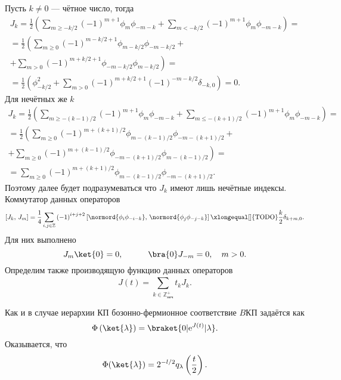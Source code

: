 \documentclass[a4paper,14pt]{extarticle}
\numberwithin{equation}{section}
\begin{document}
Пусть $k\neq 0$ --- чётное число, тогда
\begin{multline}
	J_k=\frac{1}{2} \left(\sum_{m\ge -k /2}^{} (-1)^{m+1}
	\phi_m \phi_{-m-k}+
\sum_{m<-k /2}^{} (-1)^{m+1}\phi_m \phi_{-m-k}\right)=\\=
\frac{1}{2}\left( \sum_{m\ge 0}^{} \left( -1 \right) ^{m-k /2+1}\phi_{m-k /2} \phi_{-m-k/2}\right. + \\ + \left. \sum_{m>0}^{} \left( -1 \right) ^{m+k /2+1}\phi_{-m-k /2}\phi_{m-k /2} \right) =\\=
\frac{1}{2}\left(\phi_{-k /2}^2+ \sum_{m>0}^{}\left( -1 \right) ^{m+k /2+1}\left( -1 \right) ^{-m-k /2}\delta_{-k,0}
\right) =0
.\end{multline} 
Для нечётных же $k$
\begin{multline}
	J_k=\frac{1}{2} \left(\sum_{m\ge -(k-1) /2}^{} (-1)^{m+1}
	\phi_m \phi_{-m-k}+
\sum_{m\le -(k+1) /2}^{} (-1)^{m+1}\phi_m \phi_{-m-k}\right)=\\=
\frac{1}{2}\left( \sum_{m\ge 0}^{} \left( -1 \right) ^{m+(k+1) /2}\phi_{m-(k-1) /2} \phi_{-m-(k+1)/2}\right. + \\ + \left. \sum_{m\ge 0}^{} \left( -1 \right) ^{m+(k-1) /2}\phi_{-m-(k+1) /2}\phi_{m-(k-1) /2} \right) =\\=
 \sum_{m\ge 0}^{}\left( -1 \right) ^{m+(k+1) /2}\phi_{m-(k-1) /2} \phi_{-m-(k+1)/2}
.\end{multline}
Поэтому далее будет подразумеваться что $J_k$ имеют лишь нечётные индексы.
Коммутатор данных операторов
\begin{equation}
\left[ J_k,\,J_m \right] =\frac{1}{4}
\sum_{i,j \in \mathbb{Z}}^{} \left( -1 \right) ^{i+j+2}
\left[\normord{\phi_i \phi_{-i -k}},\,\normord{\phi_j \phi_{-j -k}}\right]\xlongequal[]{\text{TODO}} \frac{k}{2} \delta_{k+m,0}
.\end{equation} 
Для них выполнено
\begin{equation}
J_m  \ket{0}=0,\qquad
\quad \bra{0}J_{-m}=0,\quad m>0
.\end{equation} 
Определим также производящую функцию данных операторов
\begin{equation}
	J(t)= \sum_{k \in \mathbb{Z}_\text{неч}^+}^{} t_k J_k%
.\end{equation} 

Как и в случае иерархии КП бозонно-фермионное
соответствие $B$КП задаётся как
\[
	\Phi\left( \ket{\lambda} \right) =\braket{0 | \mathrm{e} ^{J(t)} | \lambda}
.\] 
Оказывается, что
\[
	\Phi(\ket{\lambda})=2^{-l /2} q_\lambda\left( \frac{t}{2} \right) 
.\] 
\end{document}
